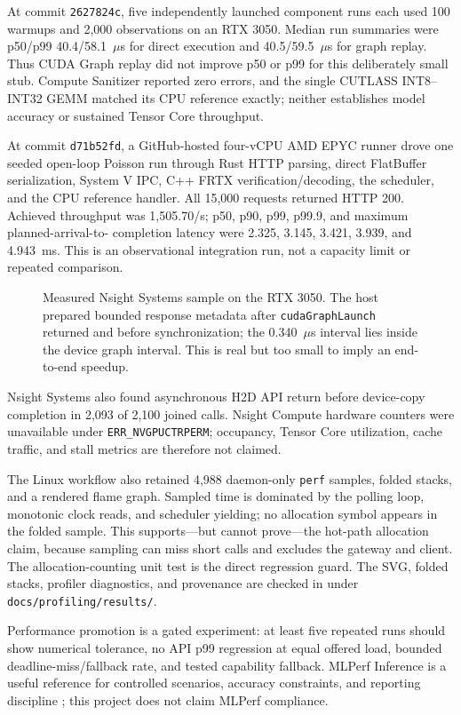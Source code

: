 \documentclass[10pt,a4paper,twocolumn]{article}
\newcommand{\code}[1]{\texttt{#1}}
\begin{document}
At commit \code{2627824c}, five independently launched component runs each used
100 warmups and 2,000 observations on an RTX 3050. Median run summaries were
p50/p99 40.4/58.1~$\mu$s for direct execution and 40.5/59.5~$\mu$s for graph
replay. Thus CUDA Graph replay did not improve p50 or p99 for this deliberately
small stub. Compute Sanitizer reported zero errors, and the single CUTLASS
INT8--INT32 GEMM matched its CPU reference exactly; neither establishes model
accuracy or sustained Tensor Core throughput.

At commit \code{d71b52fd}, a GitHub-hosted four-vCPU AMD EPYC runner drove one
seeded open-loop Poisson run through Rust HTTP parsing, direct FlatBuffer
serialization, System V IPC, C++ FRTX verification/decoding, the scheduler, and
the CPU reference handler. All 15,000 requests returned HTTP 200. Achieved
throughput was 1,505.70/s; p50, p90, p99, p99.9, and maximum planned-arrival-to-
completion latency were 2.325, 3.145, 3.421, 3.939, and 4.943~ms. This is an
observational integration run, not a capacity limit or repeated comparison.

\begin{figure}[t]\centering
\NsightEvidenceFigure
\caption{Measured Nsight Systems sample on the RTX 3050. The host prepared
bounded response metadata after \code{cudaGraphLaunch} returned and before
synchronization; the 0.340~$\mu$s interval lies inside the device graph interval.
This is real but too small to imply an end-to-end speedup.}\label{fig:nsight}
\end{figure}
\NsightEvidenceStatus{} Nsight Systems also found asynchronous H2D API return
before device-copy completion in 2,093 of 2,100 joined calls. Nsight Compute
hardware counters were unavailable under \code{ERR\_NVGPUCTRPERM}; occupancy,
Tensor Core utilization, cache traffic, and stall metrics are therefore not
claimed.

The Linux workflow also retained 4,988 daemon-only \code{perf} samples, folded
stacks, and a rendered flame graph. Sampled time is dominated by the polling
loop, monotonic clock reads, and scheduler yielding; no allocation symbol appears
in the folded sample. This supports---but cannot prove---the hot-path allocation
claim, because sampling can miss short calls and excludes the gateway and client.
The allocation-counting unit test is the direct regression guard. The SVG,
folded stacks, profiler diagnostics, and provenance are checked in under
\code{docs/profiling/results/}.

Performance promotion is a gated experiment: at least five repeated runs should
show numerical tolerance, no API p99 regression at equal offered load, bounded
deadline-miss/fallback rate, and tested capability fallback. MLPerf Inference is
a useful reference for controlled scenarios, accuracy constraints, and reporting
discipline \cite{mlperfinference}; this project does not claim MLPerf compliance.
\end{document}

